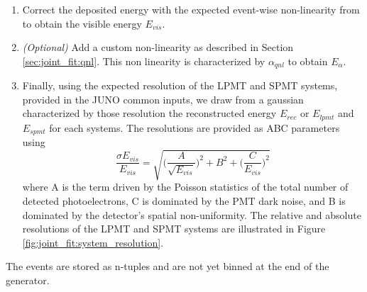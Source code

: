 \documentclass[../main.tex]{subfiles}
\begin{document}
\begin{enumerate}
  \item Correct the deposited energy with the expected event-wise non-linearity from \cite{juno_collaboration_calibration_2021} to obtain the visible energy $E_{vis}$.
  \item \textit{(Optional)} Add a custom non-linearity as described in Section \ref{sec:joint_fit:qnl}. This non linearity is characterized by $\alpha_{qnl}$ to obtain $E_{\alpha}$.
  \item Finally, using the expected resolution of the LPMT and SPMT systems,  provided in the JUNO common inputs, we draw from a gaussian characterized by those resolution the reconstructed energy $E_{rec}$ or $E_{lpmt}$ and $E_{spmt}$ for each systems. The resolutions are provided as ABC parameters using
    \begin{equation}
      \label{eq:joint_fit:abc}
      \frac{\sigma E_{vis}}{E_{vis}} = \sqrt{\bigg(\frac{A}{\sqrt{E_{vis}}}\bigg)^2 + B^2 + \bigg(\frac{C}{E_{vis}}\bigg)^2}
    \end{equation}
    where A is the term driven by the Poisson statistics of the total number of detected photoelectrons, C is dominated by the PMT dark noise, and B is dominated by the detector’s spatial non-uniformity. The relative and absolute resolutions of the LPMT and SPMT systems are illustrated in Figure \ref{fig:joint_fit:system_resolution}.
\end{enumerate}

The events are stored as n-tuples and are not yet binned at the end of the generator.
\end{document}
